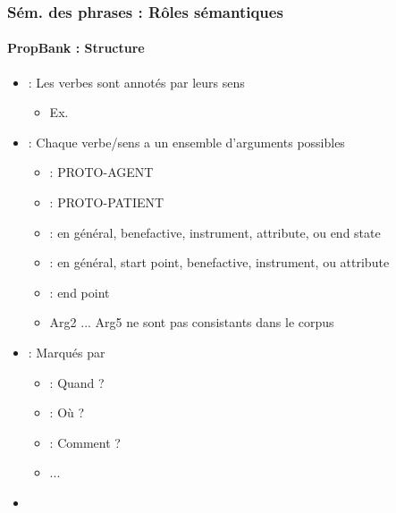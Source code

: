 \documentclass[xcolor=table]{beamer}
\begin{document}
\begin{frame}
	\frametitle{Sém. des phrases : Rôles sémantiques}
	\framesubtitle{PropBank : Structure}
	
	\begin{itemize}
		\item {} : Les verbes sont annotés par leurs sens 
		\begin{itemize}
			\item Ex. 		
		\end{itemize}
		
		\item {} : Chaque verbe/sens a un ensemble d'arguments possibles  
		\begin{itemize}
			\item {} : PROTO-AGENT
			\item {} : PROTO-PATIENT
			\item {} : en général, benefactive, instrument, attribute, ou end state
			\item {} : en général, start point, benefactive, instrument, ou attribute
			\item {} : end point
			\item Arg2 ... Arg5 ne sont pas consistants dans le corpus
		\end{itemize}
	
		\item {} : Marqués par   
		\begin{itemize}
			\item {} : Quand ?
			\item {} : Où ?
			\item {} : Comment ? 
			\item ...
		\end{itemize}
		
		\item {} 
	\end{itemize}
	
\end{frame}
\end{document}
